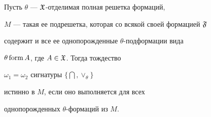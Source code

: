 \begin{lem}


Пусть $\theta$ --- $\frak{X}$-отделимая полная решетка формаций,


$M$ --- такая ее подрешетка, которая со всякой своей формацией $\frak{F}$


содержит и все ее однопорожденные $\theta$-подформации вида


$\theta\operatorname{form} A$, где $A\in\frak{X}$. Тогда тождество


$\omega_1=\omega_2$ сигнатуры $\{\bigcap,\vee_{\theta}\}$


истинно в $M$, если оно выполняется для всех


однопорожденных $\theta$-формаций из $M$.


\end{lem}





